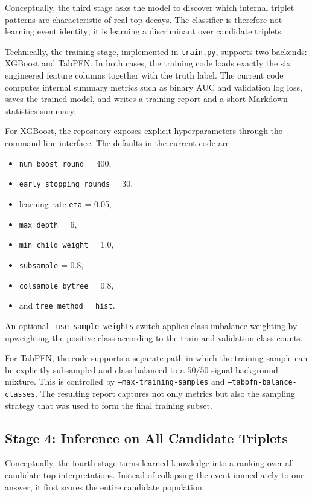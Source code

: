 \documentclass[11pt]{article}
\begin{document}
Conceptually, the third stage asks the model to discover which internal triplet patterns are characteristic of real top decays. The classifier is therefore not learning event identity; it is learning a discriminant over candidate triplets.

Technically, the training stage, implemented in \texttt{train.py}, supports two backends: XGBoost and TabPFN. In both cases, the training code loads exactly the six engineered feature columns together with the truth label. The current code computes internal summary metrics such as binary AUC and validation log loss, saves the trained model, and writes a training report and a short Markdown statistics summary.

For XGBoost, the repository exposes explicit hyperparameters through the command-line interface. The defaults in the current code are
\begin{itemize}[leftmargin=*]
  \item \texttt{num\_boost\_round} = 400,
  \item \texttt{early\_stopping\_rounds} = 30,
  \item learning rate \texttt{eta} = 0.05,
  \item \texttt{max\_depth} = 6,
  \item \texttt{min\_child\_weight} = 1.0,
  \item \texttt{subsample} = 0.8,
  \item \texttt{colsample\_bytree} = 0.8,
  \item and \texttt{tree\_method} = \texttt{hist}.
\end{itemize}
An optional \texttt{--use-sample-weights} switch applies class-imbalance weighting by upweighting the positive class according to the train and validation class counts.

For TabPFN, the code supports a separate path in which the training sample can be explicitly subsampled and class-balanced to a $50/50$ signal-background mixture. This is controlled by \texttt{--max-training-samples} and \texttt{--tabpfn-balance-classes}. The resulting report captures not only metrics but also the sampling strategy that was used to form the final training subset.

\subsection{Stage 4: Inference on All Candidate Triplets}

Conceptually, the fourth stage turns learned knowledge into a ranking over all candidate top interpretations. Instead of collapsing the event immediately to one answer, it first scores the entire candidate population.
\end{document}
